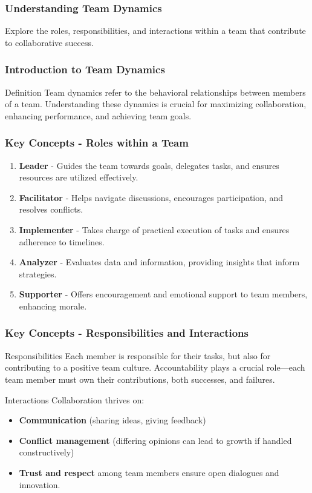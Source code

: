 \documentclass[aspectratio=169]{beamer}
\begin{document}
\begin{frame}[fragile]
    \frametitle{Understanding Team Dynamics}
    Explore the roles, responsibilities, and interactions within a team that contribute to collaborative success.
\end{frame}

\begin{frame}[fragile]
    \frametitle{Introduction to Team Dynamics}
    \begin{block}{Definition}
        Team dynamics refer to the behavioral relationships between members of a team. Understanding these dynamics is crucial for maximizing collaboration, enhancing performance, and achieving team goals.
    \end{block}
\end{frame}

\begin{frame}[fragile]
    \frametitle{Key Concepts - Roles within a Team}
    \begin{enumerate}
        \item \textbf{Leader} - Guides the team towards goals, delegates tasks, and ensures resources are utilized effectively.
        \item \textbf{Facilitator} - Helps navigate discussions, encourages participation, and resolves conflicts.
        \item \textbf{Implementer} - Takes charge of practical execution of tasks and ensures adherence to timelines.
        \item \textbf{Analyzer} - Evaluates data and information, providing insights that inform strategies.
        \item \textbf{Supporter} - Offers encouragement and emotional support to team members, enhancing morale.
    \end{enumerate}
\end{frame}

\begin{frame}[fragile]
    \frametitle{Key Concepts - Responsibilities and Interactions}
    \begin{block}{Responsibilities}
        Each member is responsible for their tasks, but also for contributing to a positive team culture. Accountability plays a crucial role—each team member must own their contributions, both successes, and failures.
    \end{block}
    
    \begin{block}{Interactions}
        Collaboration thrives on:
        \begin{itemize}
            \item \textbf{Communication} (sharing ideas, giving feedback)
            \item \textbf{Conflict management} (differing opinions can lead to growth if handled constructively)
            \item \textbf{Trust and respect} among team members ensure open dialogues and innovation.
        \end{itemize}
    \end{block}
\end{frame}
\end{document}
